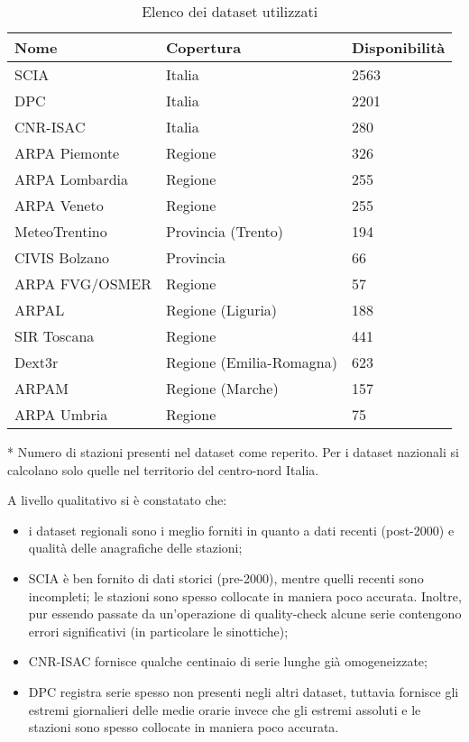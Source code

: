 \begin{table}[ht]
  \centering
  \begin{threeparttable}
    \caption{Elenco dei dataset utilizzati}\label{tab:quick-datasets}
    \begin{tabular}{l l l}
      \toprule
      Nome & Copertura & Disponibilità\tnote{*} \\
      \midrule
      SCIA & Italia & 2563 \\
      DPC & Italia & 2201 \\
      CNR-ISAC & Italia & 280 \\
      ARPA Piemonte & Regione & 326 \\
      ARPA Lombardia & Regione & 255 \\
      ARPA Veneto & Regione & 255 \\
      MeteoTrentino & Provincia (Trento) & 194 \\
      CIVIS Bolzano & Provincia & 66 \\
      ARPA FVG/OSMER & Regione & 57 \\
      ARPAL & Regione (Liguria) & 188 \\
      SIR Toscana & Regione & 441 \\
      Dext3r & Regione (Emilia-Romagna) & 623 \\
      ARPAM & Regione (Marche) & 157 \\
      ARPA Umbria & Regione & 75 \\
      \bottomrule
    \end{tabular}
    \begin{tablenotes}
    \item[*] \small Numero di stazioni presenti nel dataset come reperito. Per i dataset nazionali si calcolano solo quelle nel territorio del centro-nord Italia.
    \end{tablenotes}
  \end{threeparttable}

\end{table}

A livello qualitativo si è constatato che:

\begin{itemize}
  \item
    i dataset regionali sono i meglio forniti in quanto a dati recenti (post-2000) e qualità delle anagrafiche delle stazioni;
  \item
    SCIA è ben fornito di dati storici (pre-2000), mentre quelli recenti sono incompleti; le stazioni sono spesso collocate in maniera poco accurata. Inoltre, pur essendo passate da un'operazione di quality-check alcune serie contengono errori significativi (in particolare le sinottiche);
  \item
    CNR-ISAC fornisce qualche centinaio di serie lunghe già omogeneizzate;
  \item
    DPC registra serie spesso non presenti negli altri dataset, tuttavia fornisce gli estremi giornalieri delle medie orarie invece che gli estremi assoluti e le stazioni sono spesso collocate in maniera poco accurata.
\end{itemize}

